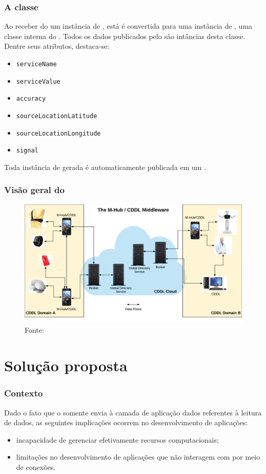 \documentclass[aspectratio=169]{beamer}
\begin{document}
\begin{frame}
	\frametitle{A classe \msg}
	Ao receber do \mhub um instância de \sensordata, está é convertida para uma instância de \msg, uma classe interna do \cddl.
	Todos os dados publicados pelo \cddl são intâncias desta classe. Dentre seus atributos, destaca-se:
	\begin{itemize}
		\item \texttt{serviceName}

		\item \texttt{serviceValue}

		\item \texttt{accuracy}

		\item \texttt{sourceLocationLatitude}

		\item \texttt{sourceLocationLongitude}

		\item \texttt{signal}
	\end{itemize}
	Toda instância de \msg gerada é automaticamente publicada em um \broker.
\end{frame}

\begin{frame}
	\frametitle{Visão geral do \mhubcddl}
	\begin{figure}
		\centering
		\includegraphics[width=0.70\linewidth]{img/general-vision-cddl.png}
		\caption{Fonte: \cite{gomes:2017}}
	\end{figure}
\end{frame}


\section{Solução proposta}


\begin{frame}
	\frametitle{Contexto}
	Dado o fato que o \cddl somente envia à camada de aplicação dados referentes à leitura de dados, as seguintes implicações ocorrem no desenvolvimento de aplicações:

	\bigskip
	\begin{itemize}
		\item incapacidade de gerenciar efetivamente recursos computacionais;

			\bigskip

		\item limitações no desenvolvimento de aplicações que não interagem com \smartobjs por meio de conexões.
	\end{itemize}
\end{frame}
\end{document}
